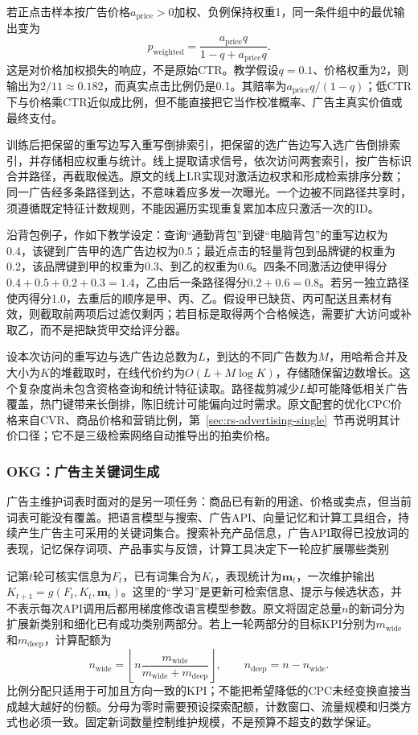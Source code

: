 若正点击样本按广告价格$a_{\mathrm{price}}>0$加权、负例保持权重1，同一条件组中的最优输出变为
\[
  p_{\mathrm{weighted}}
  =\frac{a_{\mathrm{price}}q}{1-q+a_{\mathrm{price}}q}.
\]
这是对价格加权损失的响应，不是原始CTR。教学假设$q=0.1$、价格权重为2，则输出为$2/11\approx0.182$，而真实点击比例仍是0.1。其赔率为$a_{\mathrm{price}}q/(1-q)$；低CTR下与价格乘CTR近似成比例，但不能直接把它当作校准概率、广告主真实价值或最终支付。

训练后把保留的重写边写入重写倒排索引，把保留的选广告边写入选广告倒排索引，并存储相应权重与统计。线上提取请求信号，依次访问两套索引，按广告标识合并路径，再截取候选。原文的线上LR实现对激活边权求和形成检索排序分数；同一广告经多条路径到达，不意味着应多发一次曝光。一个边被不同路径共享时，须遵循既定特征计数规则，不能因遍历实现重复累加本应只激活一次的ID。

沿背包例子，作如下教学设定：查询“通勤背包”到键“电脑背包”的重写边权为0.4，该键到广告甲的选广告边权为0.5；最近点击的轻量背包到品牌键的权重为0.2，该品牌键到甲的权重为0.3、到乙的权重为0.6。四条不同激活边使甲得分$0.4+0.5+0.2+0.3=1.4$，乙由后一条路径得分$0.2+0.6=0.8$。若另一独立路径使丙得分1.0，去重后的顺序是甲、丙、乙。假设甲已缺货、丙可配送且素材有效，则截取前两项后过滤仅剩丙；若目标是取得两个合格候选，需要扩大访问或补取乙，而不是把缺货甲交给评分器。

设本次访问的重写边与选广告边总数为$L$，到达的不同广告数为$M$，用哈希合并及大小为$K$的堆截取时，在线代价约为$O(L+M\log K)$，存储随保留边数增长。这个复杂度尚未包含资格查询和统计特征读取。路径裁剪减少$L$却可能降低相关广告覆盖，热门键带来长倒排，陈旧统计可能偏向过时需求。原文配套的优化CPC价格来自CVR、商品价格和营销比例，第~\ref{sec:rs-advertising-single}~节再说明其计价口径；它不是三级检索网络自动推导出的拍卖价格。

\subsubsection{OKG：广告主关键词生成}
\label{sec:rs-advertising-okg}

广告主维护词表时面对的是另一项任务：商品已有新的用途、价格或卖点，但当前词表可能没有覆盖。把语言模型与搜索、广告API、向量记忆和计算工具组合，持续产生广告主可采用的关键词集合。搜索补充产品信息，广告API取得已投放词的表现，记忆保存词项、产品事实与反馈，计算工具决定下一轮应扩展哪些类别

记第$t$轮可核实信息为$F_t$，已有词集合为$K_t$，表现统计为$\bm{m}_t$，一次维护输出$K_{t+1}=g(F_t,K_t,\bm{m}_t)$。这里的“学习”是更新可检索信息、提示与候选状态，并不表示每次API调用后都用梯度修改语言模型参数。原文将固定总量$n$的新词分为扩展新类别和细化已有成功类别两部分。若上一轮两部分的目标KPI分别为$m_{\mathrm{wide}}$和$m_{\mathrm{deep}}$，计算配额为
\begin{equation}
  n_{\mathrm{wide}}
  =\left\lfloor
    n\frac{m_{\mathrm{wide}}}{m_{\mathrm{wide}}+m_{\mathrm{deep}}}
   \right\rfloor,\qquad
  n_{\mathrm{deep}}=n-n_{\mathrm{wide}}.
  \label{eq:rs-advertising-okg-quota}
\end{equation}
比例分配只适用于可加且方向一致的KPI；不能把希望降低的CPC未经变换直接当成越大越好的份额。分母为零时需要预设探索配额，计数窗口、流量规模和归类方式也必须一致。固定新词数量控制维护规模，不是预算不超支的数学保证。


